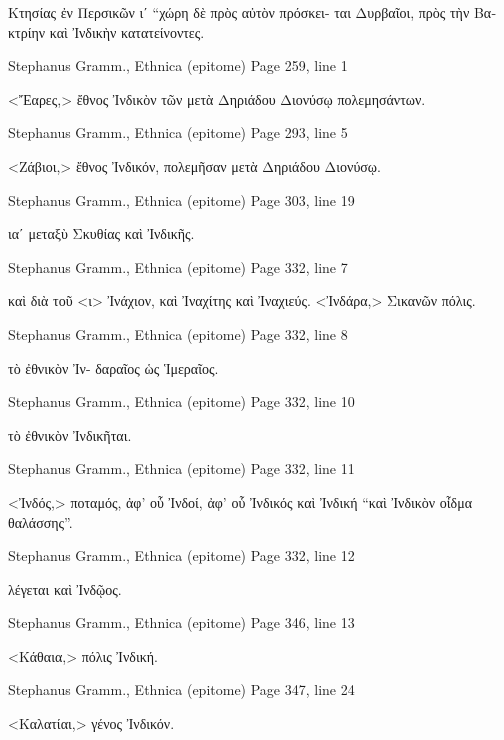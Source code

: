 \documentclass[12pt,letterpaper,twoside,final]{memoir}
\begin{document}
\begin{greek}
      Κτησίας ἐν Περσικῶν ιʹ “χώρη δὲ πρὸς αὐτὸν πρόσκει-
ται Δυρβαῖοι, πρὸς τὴν Βακτρίην καὶ Ἰνδικὴν κατατείνοντες. 



Stephanus Gramm., Ethnica (epitome) 
Page 259, line 1

<Ἔαρες,> ἔθνος Ἰνδικὸν τῶν μετὰ Δηριάδου Διονύσῳ 
πολεμησάντων. 



Stephanus Gramm., Ethnica (epitome) 
Page 293, line 5

<Ζάβιοι,> ἔθνος Ἰνδικόν, πολεμῆσαν μετὰ Δηριάδου 
Διονύσῳ. 



Stephanus Gramm., Ethnica (epitome) 
Page 303, line 19

ιαʹ μεταξὺ Σκυθίας καὶ Ἰνδικῆς. 



Stephanus Gramm., Ethnica (epitome) 
Page 332, line 7

                                                                       καὶ 
διὰ τοῦ <ι> Ἰνάχιον, καὶ Ἰναχίτης καὶ Ἰναχιεύς. 
 <Ἰνδάρα,> Σικανῶν πόλις. 



Stephanus Gramm., Ethnica (epitome) 
Page 332, line 8

                                                 τὸ ἐθνικὸν Ἰν-
δαραῖος ὡς Ἱμεραῖος. 



Stephanus Gramm., Ethnica (epitome) 
Page 332, line 10

                            τὸ ἐθνικὸν Ἰνδικῆται. 



Stephanus Gramm., Ethnica (epitome) 
Page 332, line 11

<Ἰνδός,> ποταμός, ἀφ' οὗ Ἰνδοί, ἀφ' οὗ Ἰνδικός καὶ 
Ἰνδική “καὶ Ἰνδικὸν οἶδμα θαλάσσης”. 



Stephanus Gramm., Ethnica (epitome) 
Page 332, line 12

                                                 λέγεται καὶ Ἰνδῷος. 



Stephanus Gramm., Ethnica (epitome) 
Page 346, line 13

<Κάθαια,> πόλις Ἰνδική. 



Stephanus Gramm., Ethnica (epitome) 
Page 347, line 24

<Καλατίαι,> γένος Ἰνδικόν. 




\end{greek}
\end{document}
